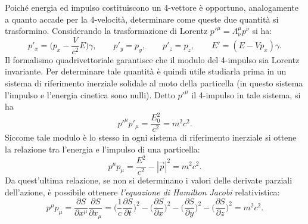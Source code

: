 Poiché energia ed impulso costituiscono un 4-vettore è opportuno, analogamente a quanto accade per la 4-velocità, determinare come queste due quantità si trasformino. Considerando la trasformazione di Lorentz $p'^\mu=\Lambda_\nu^\mu p^\nu$ si ha:
\begin{equation}
    p'_x=\bigg(p_x-\frac{V}{c^2}E\bigg)\gamma,\qquad p'_y=p_y,\qquad p'_z=p_z,\qquad E'=(E-Vp_x)\gamma.
    \label{TrasfLorentzEI}
\end{equation}
Il formalismo quadrivettoriale garantisce che il modulo del 4-impulso sia Lorentz invariante. Per determinare tale quantità è quindi utile studiarla prima in un sistema di riferimento inerziale solidale al moto della particella (in questo sistema l'impulso e l'energia cinetica sono nulli). Detto $p'^\mu$ il 4-impulso in tale sistema, si ha
\begin{equation*}
    p'^\mu p'_\mu=\frac{E_0^2}{c^2}=m^2c^2.
\end{equation*}  
Siccome tale modulo è lo stesso in ogni sistema di riferimento inerziale si ottene la relazione tra l'energia e l'impulso di una particella:
\begin{equation}
    p^\mu p_\mu=\frac{E^2}{c^2}-|\vec p |^2=m^2c^2.
    \label{relazioneEnergiaImpulso}
\end{equation}
Da quest'ultima relazione, se non si determinano i valori delle derivate parziali dell'azione, è possibile ottenere \emph{l'equazione di Hamilton Jacobi} relativistica:
\begin{equation}
    p^\mu p_\mu=\frac{\partial S }{\partial x^\mu}\frac{\partial S }{\partial x_\mu}=\bigg(\frac{1}{c}\frac{\partial S }{\partial t}\bigg)^2-\bigg(\frac{\partial S }{\partial x}\bigg)^2-\bigg(\frac{\partial S }{\partial y}\bigg)^2-\bigg(\frac{\partial S }{\partial z}\bigg)^2=m^2c^2.
\end{equation}
